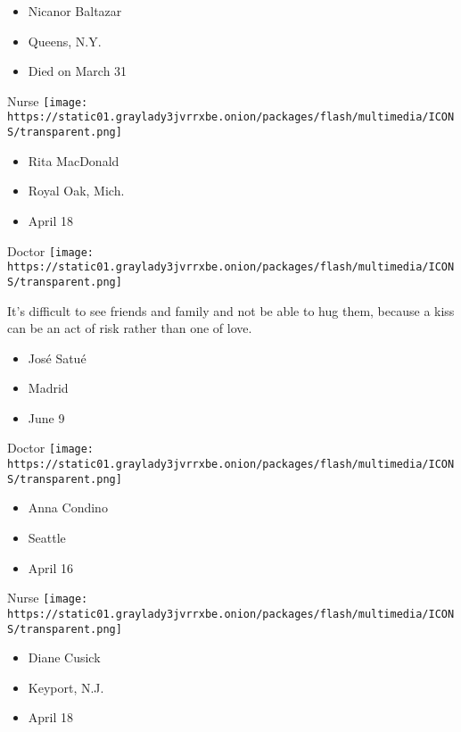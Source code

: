 \begin{itemize}
\tightlist
\item
  Nicanor Baltazar
\item
  Queens, N.Y.
\item
  Died on March 31
\end{itemize}

\protect\hyperlink{item-rita-macdonald}{}

Nurse
\texttt{[image: https://static01.graylady3jvrrxbe.onion/packages/flash/multimedia/ICONS/transparent.png]}

\begin{itemize}
\tightlist
\item
  Rita MacDonald
\item
  Royal Oak, Mich.
\item
  April 18
\end{itemize}

\protect\hyperlink{item-jose-satue}{}

Doctor
\texttt{[image: https://static01.graylady3jvrrxbe.onion/packages/flash/multimedia/ICONS/transparent.png]}

It's difficult to see friends and family and not be able to hug them,
because a kiss can be an act of risk rather than one of love.

\begin{itemize}
\tightlist
\item
  José Satué
\item
  Madrid
\item
  June 9
\end{itemize}

\protect\hyperlink{item-anna-condino}{}

Doctor
\texttt{[image: https://static01.graylady3jvrrxbe.onion/packages/flash/multimedia/ICONS/transparent.png]}

\begin{itemize}
\tightlist
\item
  Anna Condino
\item
  Seattle
\item
  April 16
\end{itemize}

\protect\hyperlink{item-diane-cusick}{}

Nurse
\texttt{[image: https://static01.graylady3jvrrxbe.onion/packages/flash/multimedia/ICONS/transparent.png]}

\begin{itemize}
\tightlist
\item
  Diane Cusick
\item
  Keyport, N.J.
\item
  April 18
\end{itemize}

